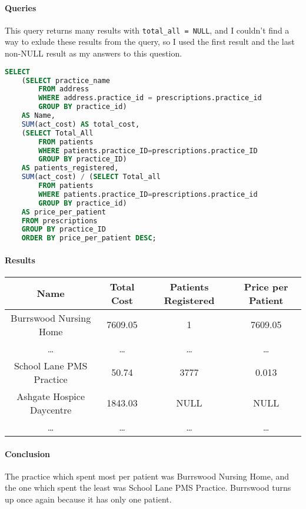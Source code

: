 \documentclass{report}
\begin{document}
\paragraph{Queries}
This query returns many results with \texttt{total\_all = NULL}, and I couldn't find a way to exlude these results from the query, so I used the first result and the last non-NULL result as my answers to this question.
\begin{lstlisting}[language=SQL, caption=Question 4 query]
SELECT
    (SELECT practice_name 
        FROM address 
        WHERE address.practice_id = prescriptions.practice_id 
        GROUP BY practice_id) 
    AS Name,
    SUM(act_cost) AS total_cost,
    (SELECT Total_All 
        FROM patients 
        WHERE patients.practice_ID=prescriptions.practice_ID 
        GROUP BY practice_ID) 
    AS patients_registered,
    SUM(act_cost) / (SELECT Total_all 
        FROM patients 
        WHERE patients.practice_ID=prescriptions.practice_id 
        GROUP BY practice_id) 
    AS price_per_patient 
    FROM prescriptions 
    GROUP BY practice_ID 
    ORDER BY price_per_patient DESC;
\end{lstlisting}
\paragraph{Results}
\begin{center}
\begin{tabular}{ | c | c | c | c | }
\hline
Name & Total Cost & Patients Registered & Price per Patient \\
\hline
Burrswood Nursing Home & 7609.05 & 1 & 7609.05 \\
\hline
\ldots & \ldots & \ldots & \ldots \\
\hline
School Lane PMS Practice & 50.74 & 3777 & 0.013 \\
\hline
Ashgate Hospice Daycentre & 1843.03 & NULL & NULL \\
\hline
\ldots & \ldots & \ldots & \ldots \\
\hline
\end{tabular}
\end{center}
\paragraph{Conclusion}
The practice which spent most per patient was Burrswood Nursing Home, and the one which spent the least was School Lane PMS Practice. Burrswood turns up once again because it has only one patient.
\end{document}
